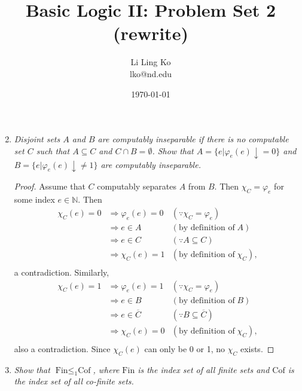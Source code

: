 \documentclass{article}
\begin{document}
\title{Basic Logic II: Problem Set 2 (rewrite)}
\author{Li Ling Ko\\ lko@nd.edu}
\date{\today}
\maketitle

\begin{enumerate}[label={\bf Q\arabic*:}]
  \setcounter{enumi}{1}
  \item \it Disjoint sets $A$ and $B$ are computably inseparable if there
    is no computable set $C$ such that $A\subseteq C$ and $C\cap
    B=\emptyset$. Show that $A=\{e|\varphi_e(e)\downarrow=0\}$ and
    $B=\{e|\varphi_e(e)\downarrow\neq1\}$ are computably inseparable.

    \begin{proof}
      Assume that $C$ computably separates $A$ from $B$. Then
      $\chi_C=\varphi_e$ for some index $e\in\mathbb{N}$. Then
      \begin{align*}
        \chi_C(e)=0 &\Rightarrow \varphi_e(e)=0 &(\because
          \chi_C=\varphi_e)\\
        &\Rightarrow e\in A &(\text{by definition of}\; A)\\
        &\Rightarrow e\in C &(\because A\subseteq C)\\
        &\Rightarrow \chi_C(e)=1 &(\text{by definition of}\; \chi_C),\\
      \end{align*}
      a contradiction. Similarly,
      \begin{align*}
        \chi_C(e)=1 &\Rightarrow \varphi_e(e)=1 &(\because
          \chi_C=\varphi_e)\\
        &\Rightarrow e\in B &(\text{by definition of}\; B)\\
        &\Rightarrow e\in \overline{C} &(\because B\subseteq
          \overline{C})\\
        &\Rightarrow \chi_C(e)=0 &(\text{by definition of}\; \chi_C),\\
      \end{align*}
      also a contradiction. Since $\chi_C(e)$ can only be 0 or 1, no
      $\chi_C$ exists.
    \end{proof}

  \item \it Show that $\text{Fin}\leq_1\text{Cof}$, where $\text{Fin}$ is
    the index set of all finite sets and $\text{Cof}$ is the index set of
    all co-finite sets.


\end{enumerate}
\end{document}
